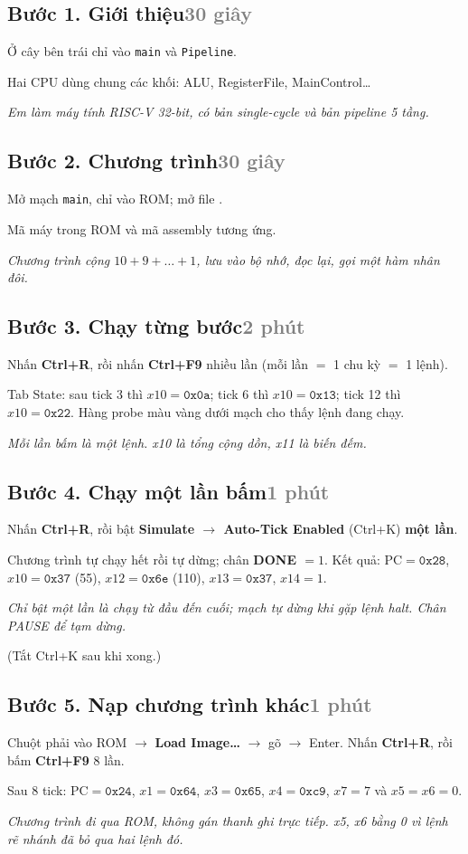 \documentclass[11pt,a4paper]{article}
\newcommand{\p}[1]{\texttt{\detokenize{#1}}}
\newcommand{\menu}[1]{\textbf{Simulate $\rightarrow$ #1}}
\newcommand{\lamgi}[1]{\item[\textbf{Làm gì:}] #1}
\newcommand{\xemgi}[1]{\item[\textbf{Cho thầy xem:}] #1}
\newcommand{\noigi}[1]{\item[\textbf{Nói:}] \emph{#1}}
\newenvironment{buoc}[2]{%
  \subsection*{#1\hfill\normalfont\small\textcolor{gray}{#2}}
  \begin{description}[leftmargin=2.8cm,style=sameline,labelwidth=2.6cm]}{\end{description}}
\begin{document}
\begin{buoc}{Bước 1. Giới thiệu}{30 giây}
  \lamgi{Ở cây bên trái chỉ vào \texttt{main} và \texttt{Pipeline}.}
  \xemgi{Hai CPU dùng chung các khối: ALU, RegisterFile, MainControl\dots}
  \noigi{Em làm máy tính RISC-V 32-bit, có bản single-cycle và bản pipeline 5 tầng.}
\end{buoc}

\begin{buoc}{Bước 2. Chương trình}{30 giây}
  \lamgi{Mở mạch \texttt{main}, chỉ vào ROM; mở file \p{programs\demo.s}.}
  \xemgi{Mã máy trong ROM và mã assembly tương ứng.}
  \noigi{Chương trình cộng $10+9+\dots+1$, lưu vào bộ nhớ, đọc lại, gọi một hàm nhân đôi.}
\end{buoc}

\begin{buoc}{Bước 3. Chạy từng bước}{2 phút}
  \lamgi{Nhấn \textbf{Ctrl+R}, rồi nhấn \textbf{Ctrl+F9} nhiều lần (mỗi lần $=$ 1 chu kỳ $=$ 1 lệnh).}
  \xemgi{Tab State: sau tick 3 thì $x10=\texttt{0x0a}$; tick 6 thì $x10=\texttt{0x13}$; tick 12 thì $x10=\texttt{0x22}$. Hàng probe màu vàng dưới mạch cho thấy lệnh đang chạy.}
  \noigi{Mỗi lần bấm là một lệnh. x10 là tổng cộng dồn, x11 là biến đếm.}
\end{buoc}

\begin{buoc}{Bước 4. Chạy một lần bấm}{1 phút}
  \lamgi{Nhấn \textbf{Ctrl+R}, rồi bật \menu{Auto-Tick Enabled} (Ctrl+K) \textbf{một lần}.}
  \xemgi{Chương trình tự chạy hết rồi tự dừng; chân \textbf{DONE $=1$}. Kết quả: $\mathrm{PC}=\texttt{0x28}$, $x10=\texttt{0x37}$ (55), $x12=\texttt{0x6e}$ (110), $x13=\texttt{0x37}$, $x14=1$.}
  \noigi{Chỉ bật một lần là chạy từ đầu đến cuối; mạch tự dừng khi gặp lệnh halt. Chân PAUSE để tạm dừng.}
  \item[] (Tắt Ctrl+K sau khi xong.)
\end{buoc}

\begin{buoc}{Bước 5. Nạp chương trình khác}{1 phút}
  \lamgi{Chuột phải vào ROM $\rightarrow$ \textbf{Load Image\dots} $\rightarrow$ gõ \p{D:\hust\logisim\programs\hazards_demo.hex} $\rightarrow$ Enter. Nhấn \textbf{Ctrl+R}, rồi bấm \textbf{Ctrl+F9} 8 lần.}
  \xemgi{Sau 8 tick: $\mathrm{PC}=\texttt{0x24}$, $x1=\texttt{0x64}$, $x3=\texttt{0x65}$, $x4=\texttt{0xc9}$, $x7=7$ và \textbf{$x5=x6=0$}.}
  \noigi{Chương trình đi qua ROM, không gán thanh ghi trực tiếp. x5, x6 bằng 0 vì lệnh rẽ nhánh đã bỏ qua hai lệnh đó.}
\end{buoc}
\end{document}
